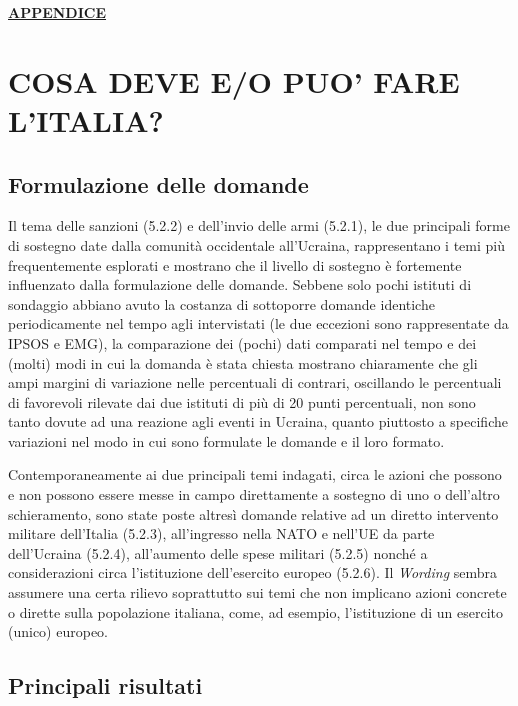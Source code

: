 \documentclass[
  openany]{book}
\begin{document}
\href{https://github.com/LucianaFazio/Ucrania/blob/main/PDF_Appendice/IV.\%20La\%20guerra\%20e\%20il\%20suo\%20andamento\%20v.4.pdf}{\textbf{APPENDICE}}

\hypertarget{cosa-deve-eo-puo-fare-litalia}{%
\chapter{COSA DEVE E/O PUO' FARE L'ITALIA?}\label{cosa-deve-eo-puo-fare-litalia}}

\hypertarget{formulazione-delle-domande-3}{%
\section{Formulazione delle domande}\label{formulazione-delle-domande-3}}

Il tema delle sanzioni (5.2.2) e dell'invio delle armi (5.2.1), le due principali forme di sostegno date dalla comunità occidentale all'Ucraina, rappresentano i temi più frequentemente esplorati e mostrano che il livello di sostegno è fortemente influenzato dalla formulazione delle domande. Sebbene solo pochi istituti di sondaggio abbiano avuto la costanza di sottoporre domande identiche periodicamente nel tempo agli intervistati (le due eccezioni sono rappresentate da IPSOS e EMG), la comparazione dei (pochi) dati comparati nel tempo e dei (molti) modi in cui la domanda è stata chiesta mostrano chiaramente che gli ampi margini di variazione nelle percentuali di contrari, oscillando le percentuali di favorevoli rilevate dai due istituti di più di 20 punti percentuali, non sono tanto dovute ad una reazione agli eventi in Ucraina, quanto piuttosto a specifiche variazioni nel modo in cui sono formulate le domande e il loro formato.

Contemporaneamente ai due principali temi indagati, circa le azioni che possono e non possono essere messe in campo direttamente a sostegno di uno o dell'altro schieramento, sono state poste altresì domande relative ad un diretto intervento militare dell'Italia (5.2.3), all'ingresso nella NATO e nell'UE da parte dell'Ucraina (5.2.4), all'aumento delle spese militari (5.2.5) nonché a considerazioni circa l'istituzione dell'esercito europeo (5.2.6). Il \emph{Wording} sembra assumere una certa rilievo soprattutto sui temi che non implicano azioni concrete o dirette sulla popolazione italiana, come, ad esempio, l'istituzione di un esercito (unico) europeo.

\hypertarget{principali-risultati-3}{%
\section{Principali risultati}\label{principali-risultati-3}}
\end{document}
